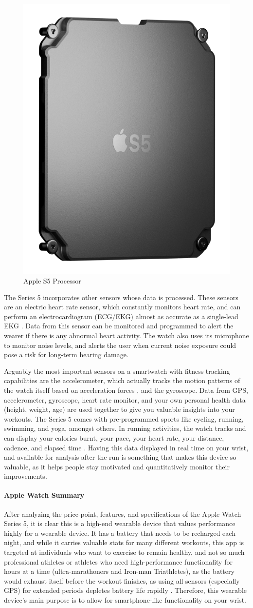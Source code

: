 \begin{figure}[h]
    \centering
    \includegraphics[width=.15\linewidth]{media/apple_s5_chip.png}
    \caption{Apple S5 Processor \cite{apple_s5_pic}}
    \label{fig:s5chip}
\end{figure}

The Series 5 incorporates other sensors whose data is processed. These sensors are an electric
heart rate sensor, which constantly monitors heart rate, and can perform an electrocardiogram 
(ECG/EKG) almost as accurate as a single-lead EKG \cite{apple_health}. Data from this sensor can
be monitored and programmed to alert the wearer if there is any abnormal heart activity. The watch
also uses its microphone to monitor noise levels, and alerts the user when current noise exposure could
pose a risk for long-term hearing damage. 

Arguably the most important sensors on a smartwatch with fitness tracking capabilities are the accelerometer,
which actually tracks the motion patterns of the watch itself based on acceleration forces \cite{accel_expl},
and the gyroscope. Data from GPS, accelerometer, gyroscope, heart rate monitor, and your own personal 
health data (height, weight, age) are
used together to give you valuable insights into your workouts. The Series 5 comes with pre-programmed
sports like cycling, running, swimming, and yoga, amongst others. In running activities, the watch
tracks and can display your calories burnt, your pace, your heart rate, your distance, cadence, and
elapsed time \cite{apple_fitness}. Having this data displayed in real time on your wrist, and available for analysis after the
run is something that makes this device so valuable, as it helps people stay motivated and quantitatively
monitor their improvements.

\paragraph{Apple Watch Summary}
After analyzing the price-point, features, and specifications of the Apple Watch Series 5, it is clear
this is a high-end wearable device that values performance highly for a wearable device. It has a battery
that needs to be recharged each night, and while it carries valuable stats for many different workouts,
this app is targeted at individuals who want to exercise to remain healthy, and not so much professional
athletes or athletes who need high-performance functionality for hours at a time (ultra-marathoners and
Iron-man Triathletes), as the battery would exhaust itself before the workout finishes, as using all sensors
(especially GPS) for extended periods depletes battery life rapidly \cite{apple_battery}. Therefore, this
wearable device's main purpose is to allow for smartphone-like functionality on your wrist.

